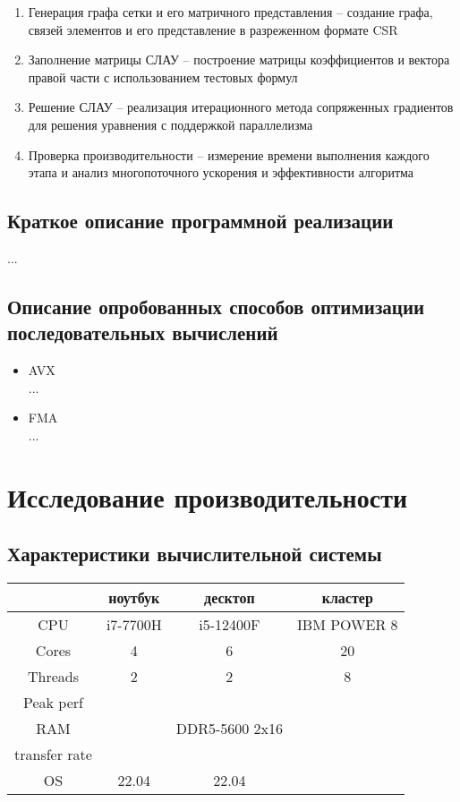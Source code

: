 \documentclass[12pt, a4paper]{article}
\begin{document}
\begin{enumerate}
	\item Генерация графа сетки и его матричного представления – создание графа, связей элементов и его представление в разреженном формате CSR
	\item Заполнение матрицы СЛАУ – построение матрицы коэффициентов и вектора правой части с использованием тестовых формул
	\item Решение СЛАУ – реализация итерационного метода сопряженных градиентов для решения уравнения с поддержкой параллелизма
	\item Проверка производительности – измерение времени выполнения каждого этапа и анализ многопоточного ускорения и эффективности алгоритма
\end{enumerate}


\subsection{Краткое описание программной реализации}

...

\subsection{Описание опробованных способов оптимизации последовательных вычислений}

\begin{itemize}
	\item AVX \\
	...
	\item FMA \\
	...
\end{itemize}


\newpage

\section{Исследование производительности}

\subsection{Характеристики вычислительной системы}

\begin{center}
	\begin{tabular}{ c|c|c|c| } 
		 & ноутбук & десктоп & кластер \\ 
		\hline
		CPU & i7-7700H & i5-12400F & IBM POWER 8 \\ 
		Cores & 4 & 6 & 20 \\ 
		Threads & 2 & 2 & 8 \\
		Peak perf &  &  &  \\
		RAM &  & DDR5-5600 2x16 &  \\
		transfer rate &  &  &  \\
		OS & 22.04 & 22.04  &  \\
	\end{tabular}
\end{center}
\end{document}
